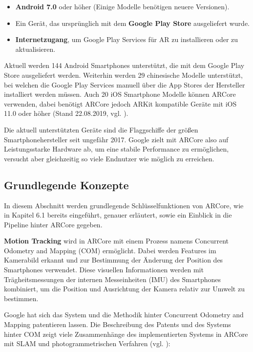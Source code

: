 \begin{itemize}
\item \textbf{Android 7.0} oder höher (Einige Modelle benötigen neuere Versionen).
\item Ein Gerät, das ursprünglich mit dem \textbf{Google Play Store} ausgeliefert wurde.
\item \textbf{Internetzugang}, um Google Play Services für AR zu installieren oder zu aktualisieren.
\end{itemize}

Aktuell werden 144 Android Smartphones unterstützt, die mit dem Google Play Store ausgeliefert werden. Weiterhin werden 29 chinesische Modelle unterstützt, bei welchen die Google Play Services manuell über die App Stores der Hersteller installiert werden müssen. Auch 20 iOS Smartphone Modelle können ARCore verwenden, dabei benötigt ARCore jedoch ARKit kompatible Geräte mit iOS 11.0 oder höher (Stand 22.08.2019, vgl. \cite{arcore_devices}).

Die aktuell unterstützten Geräte sind die Flaggschiffe der größen Smartphonehersteller seit ungefähr 2017. Google zielt mit ARCore also auf Leistungsstarke Hardware ab, um eine stabile Performance zu ermöglichen, versucht aber gleichzeitig so viele Endnutzer wie möglich zu erreichen.

\subsection{Grundlegende Konzepte}

In diesem Abschnitt werden grundlegende Schlüsselfunktionen von ARCore, wie in Kapitel 6.1 bereits eingeführt, genauer erläutert, sowie ein Einblick in die Pipeline hinter ARCore gegeben.

\textbf{Motion Tracking} wird in ARCore mit einem Prozess namens \glqq Concurrent Odometry and Mapping\grqq{} (COM) ermöglicht. Dabei werden Features im Kamerabild erkannt und zur Bestimmung der Änderung der Position des Smartphones verwendet. Diese visuellen Informationen werden mit Trägheitsmessungen der internen Messeinheiten (IMU) des Smartphones kombiniert, um die Position und Ausrichtung der Kamera relativ zur Umwelt zu bestimmen.

Google hat sich das System und die Methodik hinter \glqq Concurrent Odometry and Mapping\grqq{} patentieren lassen. Die Beschreibung des Patents und des Systems hinter COM zeigt viele Zusammenhänge des implementierten Systems in ARCore mit SLAM und photogrammetrischen Verfahren (vgl. \cite{patent}): 


